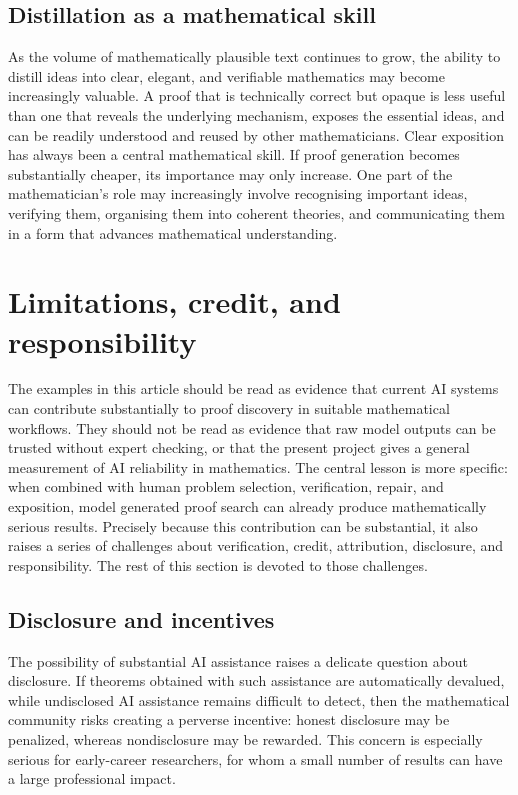 \documentclass[11pt,reqno]{amsart}
\theoremstyle{plain}
\theoremstyle{definition}
\begin{document}
\subsection{Distillation as a mathematical skill}

As the volume of mathematically plausible text continues to grow, the ability to distill ideas into clear, elegant, and verifiable mathematics may become increasingly valuable. A proof that is technically correct but opaque is less useful than one that reveals the underlying mechanism, exposes the essential ideas, and can be readily understood and reused by other mathematicians. Clear exposition has always been a central mathematical skill. If proof generation becomes substantially cheaper, its importance may only increase. One part of the mathematician's role may increasingly involve recognising important ideas, verifying them, organising them into coherent theories, and communicating them in a form that advances mathematical understanding.


\section{Limitations, credit, and responsibility}
\label{sec:limitations-credit-responsibility}

The examples in this article should be read as evidence that current AI systems can contribute substantially to proof discovery in suitable mathematical workflows. They should not be read as evidence that raw model outputs can be trusted without expert checking, or that the present project gives a general measurement of AI reliability in mathematics. The central lesson is more specific: when combined with human problem selection, verification, repair, and exposition, model generated proof search can already produce mathematically serious results. Precisely because this contribution can be substantial, it also raises a series of challenges about verification, credit, attribution, disclosure, and responsibility. The rest of this section is devoted to those challenges.

\subsection{Disclosure and incentives}

The possibility of substantial AI assistance raises a delicate question about disclosure. If theorems obtained with such assistance are automatically devalued, while undisclosed AI assistance remains difficult to detect, then the mathematical community risks creating a perverse incentive: honest disclosure may be penalized, whereas nondisclosure may be rewarded. This concern is especially serious for early-career researchers, for whom a small number of results can have a large professional impact.
\end{document}
